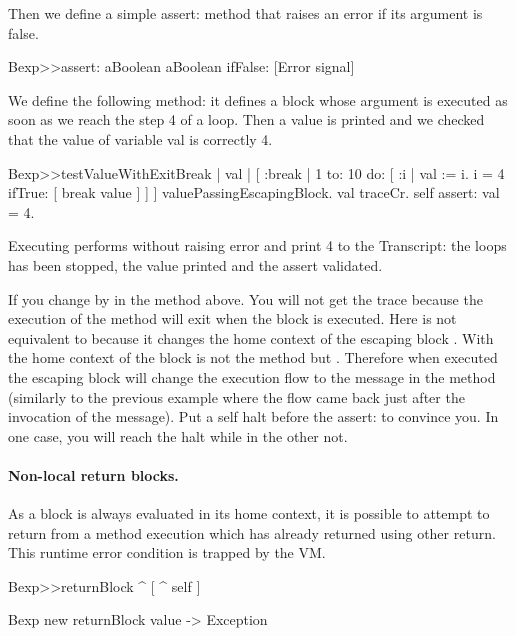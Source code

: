 \documentclass[a4paper,10pt,twoside]{book}
\begin{document}
Then we define a simple assert: method that raises an error if its argument is false.

\begin{code}{}
Bexp>>assert: aBoolean
	aBoolean ifFalse: [Error signal]
\end{code}

We define the following method: it defines a block whose argument is executed as soon as we reach the step 4 of a loop. Then a value is printed and we checked that the value of variable val is correctly 4.

\begin{code}{}
Bexp>>testValueWithExitBreak
	| val |
	[ :break |
	    1 to: 10 do: [ :i |
			         val := i.
			         i = 4 ifTrue: [ break value ] ] ] valuePassingEscapingBlock.
	val traceCr.
	self assert: val = 4.
\end{code}

Executing  performs without raising error and print 4 to the Transcript: the loops has been stopped, the value printed and the assert validated.

If you change  by  in the method above. You will not get the trace because the execution of the method  will exit when the block is executed. Here  is not equivalent to  because it changes the home context of the escaping block \ct{[ ^ nil ]}.  With  the home context of the block \ct{[^ nil]}
is not the method  but .
Therefore when executed the escaping block will change the execution flow to the  message in the method  (similarly to the previous example where the flow came back just after the invocation of the  message).
Put a self halt before the assert: to convince you. In one case, you will reach the halt while in the other not.


\paragraph{Non-local return blocks.} As a block is always evaluated in its home context, it is possible to attempt to return from a method execution which has already returned using other return. This runtime error condition is trapped by the VM.


\begin{code}{}
Bexp>>returnBlock
	^ [ ^ self ]

Bexp new returnBlock value
-> Exception
\end{code}
\end{document}

